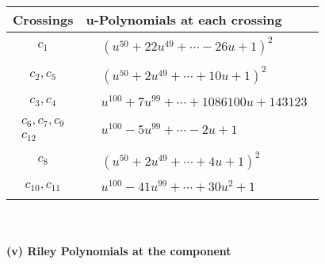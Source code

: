 \documentclass[1p]{elsarticle_modified}
\theoremstyle{definition}
\begin{document}
\begin{tabular}{m{50pt}|m{274pt}}
Crossings & \hspace{64pt}u-Polynomials at each crossing \\
\hline $$\begin{aligned}c_{1}\end{aligned}$$&$\begin{aligned}
&(u^{50}+22 u^{49}+\cdots-26 u+1)^{2}
\end{aligned}$\\
\hline $$\begin{aligned}c_{2},c_{5}\end{aligned}$$&$\begin{aligned}
&(u^{50}+2 u^{49}+\cdots+10 u+1)^{2}
\end{aligned}$\\
\hline $$\begin{aligned}c_{3},c_{4}\end{aligned}$$&$\begin{aligned}
&u^{100}+7 u^{99}+\cdots+1086100 u+143123
\end{aligned}$\\
\hline $$\begin{aligned}c_{6},c_{7},c_{9}\\c_{12}\end{aligned}$$&$\begin{aligned}
&u^{100}-5 u^{99}+\cdots-2 u+1
\end{aligned}$\\
\hline $$\begin{aligned}c_{8}\end{aligned}$$&$\begin{aligned}
&(u^{50}+2 u^{49}+\cdots+4 u+1)^{2}
\end{aligned}$\\
\hline $$\begin{aligned}c_{10},c_{11}\end{aligned}$$&$\begin{aligned}
&u^{100}-41 u^{99}+\cdots+30 u^2+1
\end{aligned}$\\
\hline
\end{tabular}\\~\\
\newpage\renewcommand{\arraystretch}{1}
\flushleft \textbf{(v) Riley Polynomials at the component}\newline \\
\end{document}

